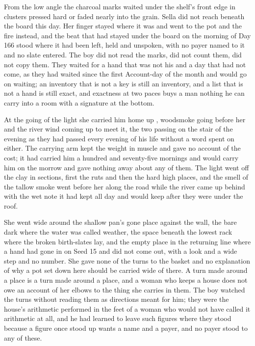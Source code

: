 From the low angle the charcoal marks waited under the shelf's front edge in clusters pressed hard or faded nearly into the grain. Sella did not reach beneath the board this day. Her finger stayed where it was and went to the pot and the fire instead, and the beat that had stayed under the board on the morning of Day 166 stood where it had been left, held and unspoken, with no payer named to it and no slate entered. The boy did not read the marks, did not count them, did not copy them. They waited for a hand that was not his and a day that had not come, as they had waited since the first Account-day of the month and would go on waiting; an inventory that is not a key is still an inventory, and a list that is not a hand is still exact, and exactness at two paces buys a man nothing he can carry into a room with a signature at the bottom.

\scenebreak

At the going of the light she carried him home up , woodsmoke going before her and the river wind coming up to meet it, the two passing on the stair of the evening as they had passed every evening of his life without a word spent on either. The carrying arm kept the weight in muscle and gave no account of the cost; it had carried him a hundred and seventy-five mornings and would carry him on the morrow and gave nothing away about any of them. The light went off the clay in sections, first the ruts and then the hard high places, and the smell of the tallow smoke went before her along the road while the river came up behind with the wet note it had kept all day and would keep after they were under the roof.

She went wide around the shallow pan's gone place against the wall, the bare dark  where the water was called weather, the space beneath the lowest rack where the broken birth-slates lay, and the empty place in the returning line where a hand had gone in on Seed 15 and did not come out, with a look and a wide step and no number. She gave none of the turns to the basket and no explanation of why a pot set down here should be carried wide of there. A turn made around a place is a turn made around a place, and a woman who keeps a house does not owe an account of her elbows to the thing she carries in them. The boy watched the turns without reading them as directions meant for him; they were the house's arithmetic performed in the feet of a woman who would not have called it arithmetic at all, and he had learned to leave such figures where they stood because a figure once stood up wants a name and a payer, and no payer stood to any of these.

